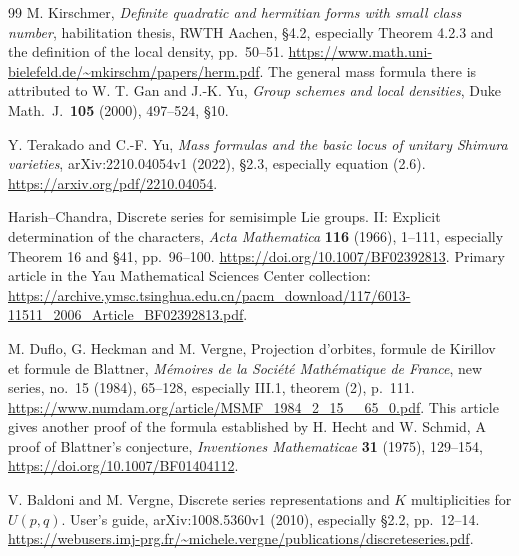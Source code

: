 \begin{thebibliography}{99}
M. Kirschmer, \emph{Definite quadratic and hermitian forms with
small class number}, habilitation thesis, RWTH Aachen,
\S4.2, especially Theorem 4.2.3 and the definition of the local density,
pp.\ 50--51.
\url{https://www.math.uni-bielefeld.de/~mkirschm/papers/herm.pdf}.
The general mass formula there is attributed to
W. T. Gan and J.-K. Yu, \emph{Group schemes and local densities},
Duke Math.\ J.\ \textbf{105} (2000), 497--524, \S10.

Y. Terakado and C.-F. Yu, \emph{Mass formulas and the basic locus
of unitary Shimura varieties}, arXiv:2210.04054v1 (2022),
\S2.3, especially equation (2.6).
\url{https://arxiv.org/pdf/2210.04054}.

Harish--Chandra, Discrete series for semisimple Lie groups. II:
Explicit determination of the characters,
\emph{Acta Mathematica} \textbf{116} (1966), 1--111,
especially Theorem 16 and \S41, pp.\ 96--100.
\url{https://doi.org/10.1007/BF02392813}.
Primary article in the Yau Mathematical Sciences Center collection:
\url{https://archive.ymsc.tsinghua.edu.cn/pacm_download/117/6013-11511_2006_Article_BF02392813.pdf}.

M. Duflo, G. Heckman and M. Vergne,
Projection d'orbites, formule de Kirillov et formule de Blattner,
\emph{M\'emoires de la Soci\'et\'e Math\'ematique de France},
new series, no.\ 15 (1984), 65--128, especially III.1,
theorem (2), p.\ 111.
\url{https://www.numdam.org/article/MSMF_1984_2_15__65_0.pdf}.
This article gives another proof of the formula established by
H. Hecht and W. Schmid, A proof of Blattner's conjecture,
\emph{Inventiones Mathematicae} \textbf{31} (1975), 129--154,
\url{https://doi.org/10.1007/BF01404112}.

V. Baldoni and M. Vergne,
Discrete series representations and $K$ multiplicities for
$U(p,q)$. User's guide, arXiv:1008.5360v1 (2010),
especially \S2.2, pp.\ 12--14.
\url{https://webusers.imj-prg.fr/~michele.vergne/publications/discreteseries.pdf}.


\end{thebibliography}
